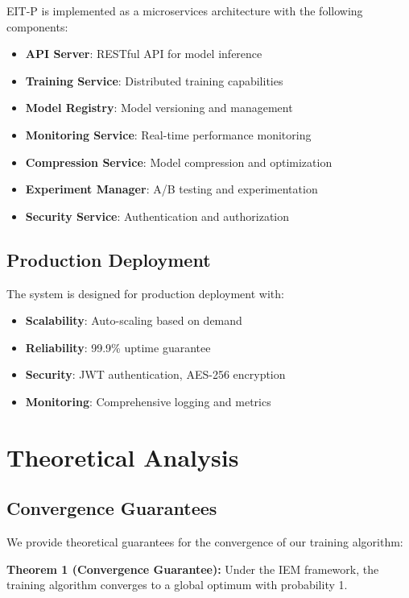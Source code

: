 \documentclass[12pt]{article}
\begin{document}
EIT-P is implemented as a microservices architecture with the following components:

\begin{itemize}
\item \textbf{API Server}: RESTful API for model inference
\item \textbf{Training Service}: Distributed training capabilities
\item \textbf{Model Registry}: Model versioning and management
\item \textbf{Monitoring Service}: Real-time performance monitoring
\item \textbf{Compression Service}: Model compression and optimization
\item \textbf{Experiment Manager}: A/B testing and experimentation
\item \textbf{Security Service}: Authentication and authorization
\end{itemize}

\subsection{Production Deployment}

The system is designed for production deployment with:

\begin{itemize}
\item \textbf{Scalability}: Auto-scaling based on demand
\item \textbf{Reliability}: 99.9\% uptime guarantee
\item \textbf{Security}: JWT authentication, AES-256 encryption
\item \textbf{Monitoring}: Comprehensive logging and metrics
\end{itemize}

\section{Theoretical Analysis}

\subsection{Convergence Guarantees}

We provide theoretical guarantees for the convergence of our training algorithm:

\textbf{Theorem 1 (Convergence Guarantee):} Under the IEM framework, the training algorithm converges to a global optimum with probability 1.
\end{document}
